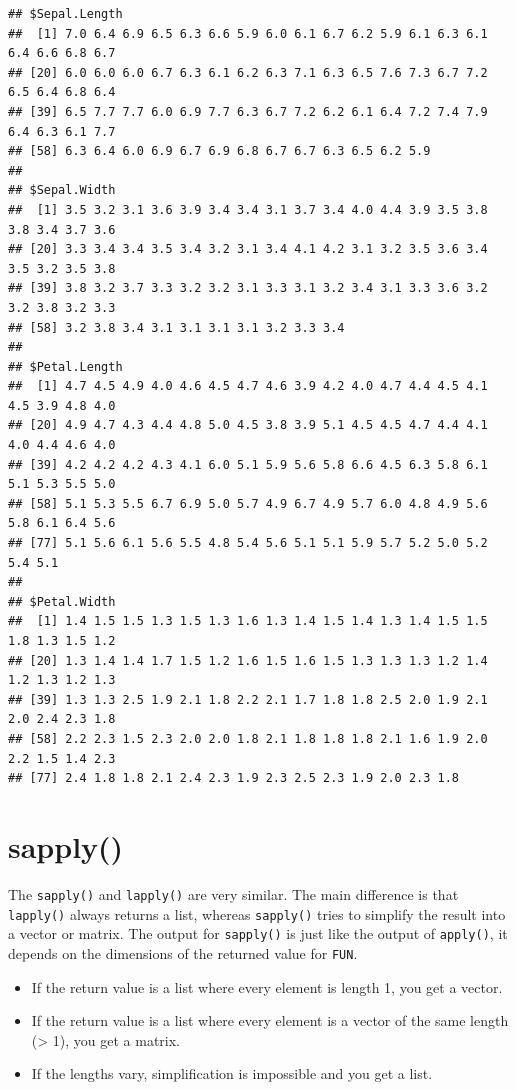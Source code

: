 \documentclass[
]{book}
\begin{document}
\begin{verbatim}
## $Sepal.Length
##  [1] 7.0 6.4 6.9 6.5 6.3 6.6 5.9 6.0 6.1 6.7 6.2 5.9 6.1 6.3 6.1 6.4 6.6 6.8 6.7
## [20] 6.0 6.0 6.0 6.7 6.3 6.1 6.2 6.3 7.1 6.3 6.5 7.6 7.3 6.7 7.2 6.5 6.4 6.8 6.4
## [39] 6.5 7.7 7.7 6.0 6.9 7.7 6.3 6.7 7.2 6.2 6.1 6.4 7.2 7.4 7.9 6.4 6.3 6.1 7.7
## [58] 6.3 6.4 6.0 6.9 6.7 6.9 6.8 6.7 6.7 6.3 6.5 6.2 5.9
## 
## $Sepal.Width
##  [1] 3.5 3.2 3.1 3.6 3.9 3.4 3.4 3.1 3.7 3.4 4.0 4.4 3.9 3.5 3.8 3.8 3.4 3.7 3.6
## [20] 3.3 3.4 3.4 3.5 3.4 3.2 3.1 3.4 4.1 4.2 3.1 3.2 3.5 3.6 3.4 3.5 3.2 3.5 3.8
## [39] 3.8 3.2 3.7 3.3 3.2 3.2 3.1 3.3 3.1 3.2 3.4 3.1 3.3 3.6 3.2 3.2 3.8 3.2 3.3
## [58] 3.2 3.8 3.4 3.1 3.1 3.1 3.1 3.2 3.3 3.4
## 
## $Petal.Length
##  [1] 4.7 4.5 4.9 4.0 4.6 4.5 4.7 4.6 3.9 4.2 4.0 4.7 4.4 4.5 4.1 4.5 3.9 4.8 4.0
## [20] 4.9 4.7 4.3 4.4 4.8 5.0 4.5 3.8 3.9 5.1 4.5 4.5 4.7 4.4 4.1 4.0 4.4 4.6 4.0
## [39] 4.2 4.2 4.2 4.3 4.1 6.0 5.1 5.9 5.6 5.8 6.6 4.5 6.3 5.8 6.1 5.1 5.3 5.5 5.0
## [58] 5.1 5.3 5.5 6.7 6.9 5.0 5.7 4.9 6.7 4.9 5.7 6.0 4.8 4.9 5.6 5.8 6.1 6.4 5.6
## [77] 5.1 5.6 6.1 5.6 5.5 4.8 5.4 5.6 5.1 5.1 5.9 5.7 5.2 5.0 5.2 5.4 5.1
## 
## $Petal.Width
##  [1] 1.4 1.5 1.5 1.3 1.5 1.3 1.6 1.3 1.4 1.5 1.4 1.3 1.4 1.5 1.5 1.8 1.3 1.5 1.2
## [20] 1.3 1.4 1.4 1.7 1.5 1.2 1.6 1.5 1.6 1.5 1.3 1.3 1.3 1.2 1.4 1.2 1.3 1.2 1.3
## [39] 1.3 1.3 2.5 1.9 2.1 1.8 2.2 2.1 1.7 1.8 1.8 2.5 2.0 1.9 2.1 2.0 2.4 2.3 1.8
## [58] 2.2 2.3 1.5 2.3 2.0 2.0 1.8 2.1 1.8 1.8 1.8 2.1 1.6 1.9 2.0 2.2 1.5 1.4 2.3
## [77] 2.4 1.8 1.8 2.1 2.4 2.3 1.9 2.3 2.5 2.3 1.9 2.0 2.3 1.8
\end{verbatim}

\hypertarget{sapply}{%
\section{sapply()}\label{sapply}}

The \texttt{sapply()} and \texttt{lapply()} are very similar. The main difference is that \texttt{lapply()} always returns a list, whereas \texttt{sapply()} tries to simplify the result into a vector or matrix. The output for \texttt{sapply()} is just like the output of \texttt{apply()}, it depends on the dimensions of the returned value for \texttt{FUN}.

\begin{itemize}
\item
  If the return value is a list where every element is length 1, you get a vector.
\item
  If the return value is a list where every element is a vector of the same length (\textgreater{} 1), you get a matrix.
\item
  If the lengths vary, simplification is impossible and you get a list.
\end{itemize}
\end{document}

